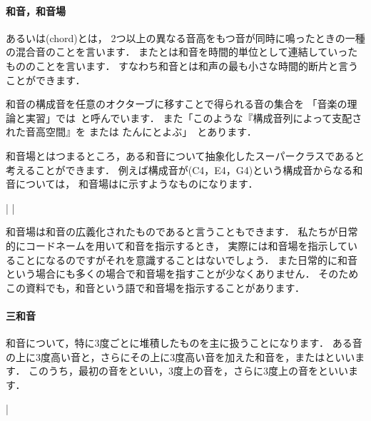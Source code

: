 \documentclass[dvipdfmx,uplatex,b5paper,openany,jbase=12Q,nomag*,textwidth-limit=44%
               ]{gachimuchi}[2020/05/05]
\begin{document}
\paragraph{和音，和音場}
あるいは\jghost(chord)とは，
2つ以上の異なる音高をもつ音が同時に鳴ったときの一種の混合音のことを言います．
またとは和音を時間的単位として連結していったもののことを言います．
すなわち和音とは和声の最も小さな時間的断片と言うことができます．

和音の構成音を任意のオクターブに移すことで得られる音の集合を
「音楽の理論と実習」では~\cite[p.58]{ctSHIMAOKA1i}と呼んでいます．
また「このような『構成音列によって支配された音高空間』を
または
たんにとよぶ」~\cite[p.59]{ctSHIMAOKA1i}とあります．

和音場とはつまるところ，ある和音について抽象化したスーパークラスであると考えることができます．
例えば構成音が(C4，E4，G4)という構成音からなる和音については，
和音場はに示すようなものになります．

\begin{Music}[.6\linewidth]
  \Startpiece%
  \NOtes\en\def\atnextbar{\znotes|\centerbar{\zw{-2}\zw{0}\zw{2}}\en}\bar
  \notes
  |\sk
  \en%
  \endpiece%
\end{Music}

和音場は和音の広義化されたものであると言うこともできます．
私たちが日常的にコードネームを用いて和音を指示するとき，
実際には和音場を指示していることになるのですがそれを意識することはないでしょう．
また日常的に和音という場合にも多くの場合で和音場を指すことが少なくありません．
そのためこの資料でも，和音という語で和音場を指示することがあります．

\paragraph{三和音}
和音について，特に3度ごとに堆積したものを主に扱うことになります．
ある音の上に3度高い音と，さらにその上に3度高い音を加えた和音を，またはといいます．
このうち，最初の音をといい，3度上の音を，さらに3度上の音をといいます．

\begin{Music}[.5\linewidth]
  \nostartrule%
  \Startpiece%
  \Notes%
  \en\bar%
  \Notes%
  \en%
  \endpiece%
\end{Music}
\end{document}
